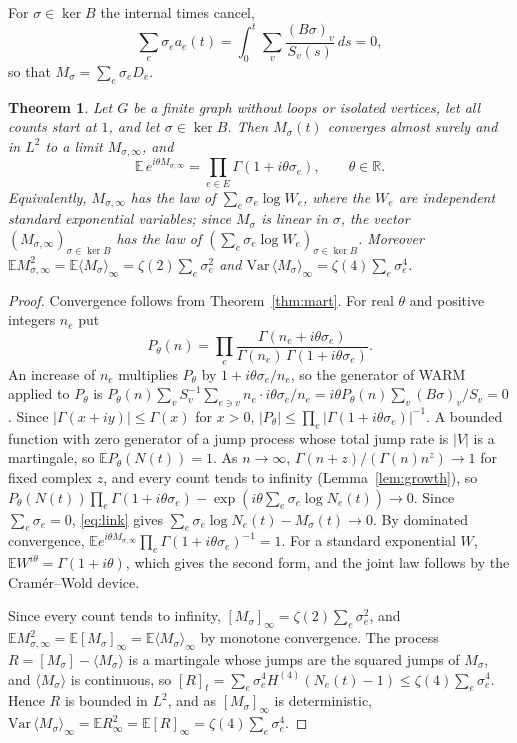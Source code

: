 \documentclass[11pt]{amsart}
\newtheorem{theorem}{Theorem}\newtheorem{lemma}[theorem]{Lemma}\newtheorem{proposition}[theorem]{Proposition}
\theoremstyle{remark}\newtheorem{remark}[theorem]{Remark}
\begin{document}
For $\sigma\in\ker B$ the internal times cancel,
\[ \sum_e\sigma_ea_e(t)=\int_0^t\sum_v\frac{(B\sigma)_v}{S_v(s)}\,ds=0, \]
so that $M_\sigma=\sum_e\sigma_eD_e$.

\begin{theorem}\label{thm:law}
Let $G$ be a finite graph without loops or isolated vertices, let all counts start at $1$, and let $\sigma\in\ker B$. Then $M_\sigma(t)$ converges almost surely and in $L^2$ to a limit $M_{\sigma,\infty}$, and
\[ \mathbb{E}\,e^{i\theta M_{\sigma,\infty}}=\prod_{e\in E}\Gamma(1+i\theta\sigma_e),\qquad\theta\in\mathbb{R}. \]
Equivalently, $M_{\sigma,\infty}$ has the law of $\sum_e\sigma_e\log W_e$, where the $W_e$ are independent standard
exponential variables; since $M_\sigma$ is linear in $\sigma$, the vector $(M_{\sigma,\infty})_{\sigma\in\ker B}$ has the
law of $(\sum_e\sigma_e\log W_e)_{\sigma\in\ker B}$. Moreover $\mathbb{E}M_{\sigma,\infty}^2=
\mathbb{E}\langle M_\sigma\rangle_\infty=\zeta(2)\sum_e\sigma_e^2$ and
$\mathrm{Var}\,\langle M_\sigma\rangle_\infty=\zeta(4)\sum_e\sigma_e^4$.
\end{theorem}
\begin{proof}
Convergence follows from Theorem~\ref{thm:mart}. For real $\theta$ and positive integers $n_e$ put
\[ P_\theta(n)=\prod_e\frac{\Gamma(n_e+i\theta\sigma_e)}{\Gamma(n_e)\,\Gamma(1+i\theta\sigma_e)} . \]
An increase of $n_e$ multiplies $P_\theta$ by $1+i\theta\sigma_e/n_e$, so the generator of WARM applied to $P_\theta$
is $P_\theta(n)\sum_v S_v^{-1}\sum_{e\ni v}n_e\cdot i\theta\sigma_e/n_e=i\theta P_\theta(n)\sum_v(B\sigma)_v/S_v=0$. Since
$|\Gamma(x+iy)|\le\Gamma(x)$ for $x>0$, $|P_\theta|\le\prod_e|\Gamma(1+i\theta\sigma_e)|^{-1}$. A bounded function with
zero generator of a jump process whose total jump rate is $|V|$ is a martingale, so $\mathbb{E}P_\theta(N(t))=1$. As
$n\to\infty$, $\Gamma(n+z)/(\Gamma(n)n^z)\to1$ for fixed complex $z$, and every count tends to infinity
(Lemma~\ref{lem:growth}), so $P_\theta(N(t))\prod_e\Gamma(1+i\theta\sigma_e)-\exp(i\theta\sum_e\sigma_e\log N_e(t))\to0$.
Since $\sum_e\sigma_e=0$, \eqref{eq:link} gives $\sum_e\sigma_e\log N_e(t)-M_\sigma(t)\to0$. By dominated convergence,
$\mathbb{E}e^{i\theta M_{\sigma,\infty}}\prod_e\Gamma(1+i\theta\sigma_e)^{-1}=1$. For a standard exponential $W$,
$\mathbb{E}W^{i\theta}=\Gamma(1+i\theta)$, which gives the second form, and the joint law follows by the Cram\'er--Wold
device.

Since every count tends to infinity, $[M_\sigma]_\infty=\zeta(2)\sum_e\sigma_e^2$, and
$\mathbb{E}M_{\sigma,\infty}^2=\mathbb{E}[M_\sigma]_\infty=\mathbb{E}\langle M_\sigma\rangle_\infty$ by monotone
convergence. The process $R=[M_\sigma]-\langle M_\sigma\rangle$ is a martingale whose jumps are the squared jumps of
$M_\sigma$, and $\langle M_\sigma\rangle$ is continuous, so
$[R]_t=\sum_e\sigma_e^4H^{(4)}(N_e(t)-1)\le\zeta(4)\sum_e\sigma_e^4$. Hence $R$ is bounded in $L^2$, and as
$[M_\sigma]_\infty$ is deterministic,
$\mathrm{Var}\,\langle M_\sigma\rangle_\infty=\mathbb{E}R_\infty^2=\mathbb{E}[R]_\infty=\zeta(4)\sum_e\sigma_e^4$.
\end{proof}
\end{document}
